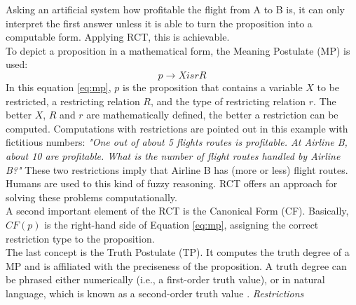 \documentclass[conference]{IEEEtran}
\begin{document}
Asking an artificial system how profitable the flight from A to B is, it can only interpret the first answer unless it is able to turn the proposition into a computable form. Applying RCT, this is achievable. \\
To depict a proposition in a mathematical form, the Meaning Postulate (MP) is used:
\begin{equation} \label{eq:mp}
p \rightarrow X isr R
\end{equation}
In this equation \ref{eq:mp}, 
$p$ is the proposition that contains a variable $X$ to be restricted, a restricting relation $R$, and the type of restricting relation $r$. The better \begin{math} X \end{math}, \begin{math} R \end{math} and \begin{math} r \end{math} are mathematically defined, the better a restriction can be computed. Computations with restrictions are pointed out in this example with fictitious numbers: \emph{"One out of about 5 flights routes is profitable. At Airline B, about 10 are profitable. What is the number of flight routes handled by Airline B?"} These two restrictions imply that Airline B has (more or less) flight routes. Humans are used to this kind of fuzzy reasoning. RCT offers an approach for solving these problems computationally.\\
A second important element of the RCT is the Canonical Form (CF). Basically, \begin{math} CF(p) \end{math} is the right-hand side of Equation \ref{eq:mp}, assigning the correct restriction type to the proposition.\\
The last concept is the Truth Postulate (TP). It computes the truth degree of a MP and is affiliated with the preciseness of the proposition. A truth degree can be phrased either numerically (i.e., a first-order truth value), or in natural language, which is known as a second-order truth value \cite{zadeh2013}.
\vspace{2mm}
\newline
\emph{Restrictions}
\vspace{1mm}
\newline
\label{subsubsec:restrictions}
\end{document}
